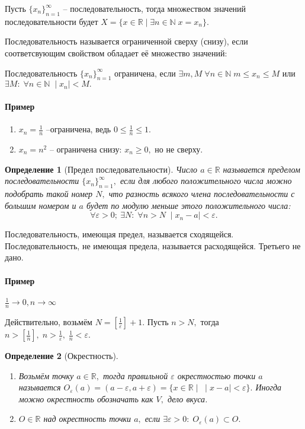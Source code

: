 \documentclass{article}
\newtheorem{Definition}{Определение}[section]
\begin{document}
Пусть $\{x_n\}_{n=1}^{\infty}$ -- последовательность, тогда множеством значений последовательности будет $X=\{x\in\mathbb{R}\mid\exists n\in\mathbb{N} \; x=x_n\}.$

Последовательность называется ограниченной сверху (снизу), если соответсвующим свойством обладает её множество значений: 

Последовательность $\{x_n\}_{n=1}^{\infty}$ ограничена, если $\exists m, M \; \forall n\in\mathbb{N} \; m\leq x_n\leq M$ или $\exists M: \; \forall n\in\mathbb{N} \; \mid x_n\mid<M.$

\paragraph{Пример}
\begin{enumerate}
\item $x_n=\frac{1}{n}$ --ограничена, ведь $0\leq\frac{1}{n}\leq1.$
\item $x_n=n^2$ -- ограничена снизу: $x_n\geq 0,$ но не сверху.
\end{enumerate}

\begin{Definition}[Предел последовательности]
Число $a\in\mathbb{R}$ называется пределом последовательности $\{x_n\}_{n=1}^{\infty},$ если для любого положительного числа можно подобрать такой номер $N,$ что разность всякого члена последовательности с большим номером и $a$ будет по модулю меньше этого положительного числа: $$\forall \varepsilon>0 ;\ \exists N: \; \forall n>N \; \mid x_n-a\mid<\varepsilon.$$
\end{Definition}

Последовательность, имеющая предел, называется сходящейся.
Последовательность, не имеющая предела, называется расходящейся.
Третьего не дано.

\paragraph{Пример}
$\frac{1}{n} \rightarrow 0, n\rightarrow \infty$

Действительно, возьмём $N=\left[\frac{1}{\varepsilon}\right] +1.$ Пусть $n>N,$ тогда $n>\left[\frac{1}{n}\right], \; n>\frac{1}{\varepsilon}, \; \frac{1}{n}<\varepsilon.$

\begin{Definition}[Окрестность]
\begin{enumerate}
\item Возьмём точку $a\in\mathbb{R},$ тогда правильной $\varepsilon$ окрестностью точки $a$ называется $O_{\varepsilon}(a)=(a-\varepsilon, a+\varepsilon) = \{x\in\mathbb{R}\mid \; \mid x-a\mid<\varepsilon\}.$ Иногда можно окрестность обозначать как $V,$ дело вкуса.
\item $O\in\mathbb{R}$ над окрестность точки $a,$ если $\exists\varepsilon>0: \; O_{\varepsilon}(a)\subset O.$
\end{enumerate}
\end{Definition}
\end{document}
